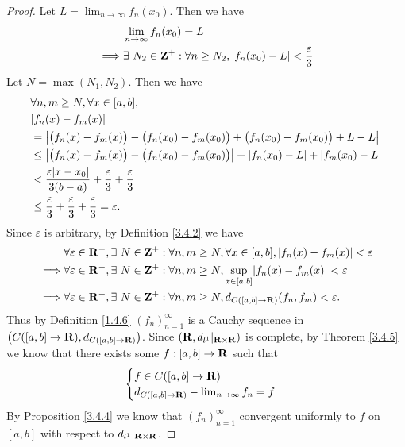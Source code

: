 \begin{proof}
    Let \(L = \lim_{n \to \infty} f_n(x_0)\).
    Then we have
    \begin{align*}
                 & \lim_{n \to \infty} f_n(x_0) = L                                                       \\
        \implies & \exists\ N_2 \in \mathbf{Z}^+ : \forall n \geq N_2, \left\lvert f_n(x_0) - L\right\rvert < \frac{\varepsilon}{3}
    \end{align*}
    Let \(N = \max(N_1, N_2)\).
    Then we have
    \begin{align*}
         & \forall n, m \geq N, \forall x \in [a, b],                                                                     \\
         & \abs{f_n(x) - f_m(x)}                                                                                          \\
         & = \abs{\big(f_n(x) - f_m(x)\big) - \big(f_n(x_0) - f_m(x_0)\big) + \big(f_n(x_0) - f_m(x_0)\big) + L - L}      \\
         & \leq \abs{\big(f_n(x) - f_m(x)\big) - \big(f_n(x_0) - f_m(x_0)\big)} + \abs{f_n(x_0) - L} + \abs{f_m(x_0) - L} \\
         & < \frac{\varepsilon \abs{x - x_0}}{3(b - a)} + \frac{\varepsilon}{3} + \frac{\varepsilon}{3}                   \\
         & \leq \frac{\varepsilon}{3} + \frac{\varepsilon}{3} + \frac{\varepsilon}{3} = \varepsilon.
    \end{align*}
    Since \(\varepsilon\) is arbitrary, by Definition \ref{3.4.2} we have
    \begin{align*}
                 & \forall \varepsilon \in \R^+, \exists\ N \in \Z^+ : \forall n, m \geq N, \forall x \in [a, b], \abs{f_n(x) - f_m(x)} < \varepsilon \\
        \implies & \forall \varepsilon \in \R^+, \exists\ N \in \Z^+ : \forall n, m \geq N, \sup_{x \in [a, b]}\abs{f_n(x) - f_m(x)} < \varepsilon    \\
        \implies & \forall \varepsilon \in \R^+, \exists\ N \in \Z^+ : \forall n, m \geq N, d_{C([a, b] \to \R)}(f_n, f_m) < \varepsilon.
    \end{align*}
    Thus by Definition \ref{1.4.6} \((f_n)_{n = 1}^\infty\) is a Cauchy sequence in \(\big(C([a, b] \to \mathbf{R}), d_{C([a, b] \to \mathbf{R})}\big)\).
    Since \((\mathbf{R}, d_{l^1}|_{\mathbf{R} \times \mathbf{R}})\) is complete, by Theorem \ref{3.4.5} we know that there exists some \(f : [a, b] \to \mathbf{R}\) such that
    \[
        \begin{cases}
            f \in C([a, b] \to \mathbf{R}) \\
            d_{C([a, b] \to \mathbf{R})} - \lim_{n \to \infty} f_n = f
        \end{cases}
    \]
    By Proposition \ref{3.4.4} we know that \((f_n)_{n = 1}^\infty\) convergent uniformly to \(f\) on \([a, b]\) with respect to \(d_{l^1}|_{\mathbf{R} \times \mathbf{R}}\).


\end{proof}
